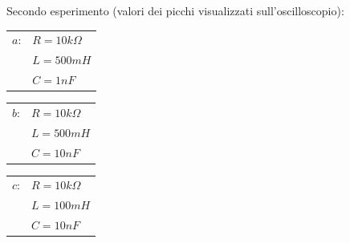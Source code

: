     Secondo esperimento (valori dei picchi visualizzati sull'oscilloscopio): \par
    \begin{tabular}{c l}
        $a$: & $R=10k\Omega$ \\
        & $L=500mH$ \\
        & $C=1nF$ \\
    \end{tabular}
    \hspace{2.5cm}
    \begin{tabular}{c l}
        $b$: & $R=10k\Omega$ \\
        & $L=500mH$ \\
        & $C=10nF$ \\
    \end{tabular}
    \hspace{2.25cm}
    \begin{tabular}{c l}
        $c$: & $R=10k\Omega$ \\
        & $L=100mH $ \\
        & $C=10nF$ \\
    \end{tabular}

